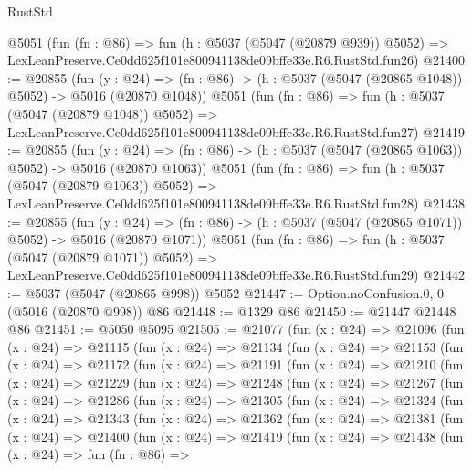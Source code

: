 \begin{lexlean}{RustStd}
\begin{coremodule}
    @5051
    (fun (fn : @86) =>
    fun (h : @5037 (@5047 (@20879 @939)) @5052) =>
    LexLeanPreserve.Ce0dd625f101e800941138de09bffe33e.R6.RustStd.fun26)
@21400 := @20855
    (fun (y : @24) =>
    (fn : @86) -> (h : @5037 (@5047 (@20865 @1048)) @5052) -> @5016 (@20870 @1048))
    @5051
    (fun (fn : @86) =>
    fun (h : @5037 (@5047 (@20879 @1048)) @5052) =>
    LexLeanPreserve.Ce0dd625f101e800941138de09bffe33e.R6.RustStd.fun27)
@21419 := @20855
    (fun (y : @24) =>
    (fn : @86) -> (h : @5037 (@5047 (@20865 @1063)) @5052) -> @5016 (@20870 @1063))
    @5051
    (fun (fn : @86) =>
    fun (h : @5037 (@5047 (@20879 @1063)) @5052) =>
    LexLeanPreserve.Ce0dd625f101e800941138de09bffe33e.R6.RustStd.fun28)
@21438 := @20855
    (fun (y : @24) =>
    (fn : @86) -> (h : @5037 (@5047 (@20865 @1071)) @5052) -> @5016 (@20870 @1071))
    @5051
    (fun (fn : @86) =>
    fun (h : @5037 (@5047 (@20879 @1071)) @5052) =>
    LexLeanPreserve.Ce0dd625f101e800941138de09bffe33e.R6.RustStd.fun29)
@21442 := @5037 (@5047 (@20865 @998)) @5052
@21447 := Option.noConfusion.{0, 0} (@5016 (@20870 @998)) @86
@21448 := @1329 @86
@21450 := @21447 @21448 @86
@21451 := @5050 @5095
@21505 := @21077
    (fun (x : @24) =>
    @21096
      (fun (x : @24) =>
      @21115
        (fun (x : @24) =>
        @21134
          (fun (x : @24) =>
          @21153
            (fun (x : @24) =>
            @21172
              (fun (x : @24) =>
              @21191
                (fun (x : @24) =>
                @21210
                  (fun (x : @24) =>
                  @21229
                    (fun (x : @24) =>
                    @21248
                      (fun (x : @24) =>
                      @21267
                        (fun (x : @24) =>
                        @21286
                          (fun (x : @24) =>
                          @21305
                            (fun (x : @24) =>
                            @21324
                              (fun (x : @24) =>
                              @21343
                                (fun (x : @24) =>
                                @21362
                                  (fun (x : @24) =>
                                  @21381
                                    (fun (x : @24) =>
                                    @21400
                                      (fun (x : @24) =>
                                      @21419
                                        (fun (x : @24) =>
                                        @21438
                                          (fun (x : @24) =>
                                          fun (fn : @86) =>

\end{coremodule}
\end{lexlean}
